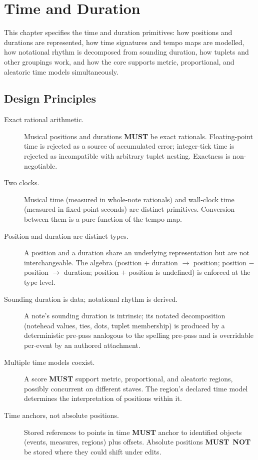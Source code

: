 \documentclass[11pt,letterpaper]{report}
\newcommand{\MUST}{\textbf{MUST}}
\newcommand{\MUSTNOT}{\textbf{MUST}\nobreak\ \textbf{NOT}}
\begin{document}
\chapter{Time and Duration}
\label{ch:time}

This chapter specifies the time and duration primitives: how positions
and durations are represented, how time signatures and tempo maps are
modelled, how notational rhythm is decomposed from sounding duration,
how tuplets and other groupings work, and how the core supports metric,
proportional, and aleatoric time models simultaneously.

\section{Design Principles}
\label{sec:time:principles}

\begin{description}
  \item[Exact rational arithmetic.] Musical positions and durations
    \MUST{} be exact rationals. Floating-point time is rejected as a
    source of accumulated error; integer-tick time is rejected as
    incompatible with arbitrary tuplet nesting. Exactness is
    non-negotiable.
  \item[Two clocks.] Musical time (measured in whole-note rationals)
    and wall-clock time (measured in fixed-point seconds) are distinct
    primitives. Conversion between them is a pure function of the
    tempo map.
  \item[Position and duration are distinct types.] A position and a
    duration share an underlying representation but are not
    interchangeable. The algebra (position $+$ duration $\rightarrow$ position;
    position $-$ position $\rightarrow$ duration; position $+$ position is
    undefined) is enforced at the type level.
  \item[Sounding duration is data; notational rhythm is derived.]
    A note's sounding duration is intrinsic; its notated decomposition
    (notehead values, ties, dots, tuplet membership) is produced by a
    deterministic pre-pass analogous to the spelling pre-pass and is
    overridable per-event by an authored attachment.
  \item[Multiple time models coexist.] A score \MUST{} support metric,
    proportional, and aleatoric regions, possibly concurrent on
    different staves. The region's declared time model determines the
    interpretation of positions within it.
  \item[Time anchors, not absolute positions.] Stored references to
    points in time \MUST{} anchor to identified objects (events,
    measures, regions) plus offsets. Absolute positions \MUSTNOT{}
    be stored where they could shift under edits.
\end{description}
\end{document}
